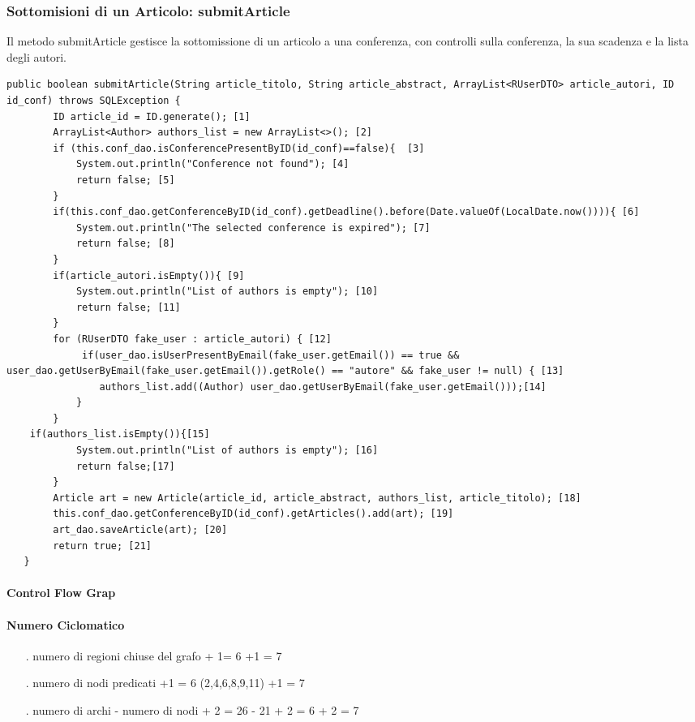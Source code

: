 \subsubsection{Sottomisioni di un Articolo: submitArticle}
Il metodo submitArticle gestisce la sottomissione di un articolo a una conferenza, con controlli sulla conferenza, la sua scadenza e la lista degli autori.
\begin{lstlisting}
public boolean submitArticle(String article_titolo, String article_abstract, ArrayList<RUserDTO> article_autori, ID id_conf) throws SQLException { 
        ID article_id = ID.generate(); [1]
        ArrayList<Author> authors_list = new ArrayList<>(); [2]
        if (this.conf_dao.isConferencePresentByID(id_conf)==false){  [3]
            System.out.println("Conference not found"); [4]
            return false; [5]
        }
        if(this.conf_dao.getConferenceByID(id_conf).getDeadline().before(Date.valueOf(LocalDate.now()))){ [6]
            System.out.println("The selected conference is expired"); [7]
            return false; [8]
        }
        if(article_autori.isEmpty()){ [9]
            System.out.println("List of authors is empty"); [10] 
            return false; [11]
        }
        for (RUserDTO fake_user : article_autori) { [12]
             if(user_dao.isUserPresentByEmail(fake_user.getEmail()) == true && user_dao.getUserByEmail(fake_user.getEmail()).getRole() == "autore" && fake_user != null) { [13]
                authors_list.add((Author) user_dao.getUserByEmail(fake_user.getEmail()));[14]
            }
        }
	if(authors_list.isEmpty()){[15]
            System.out.println("List of authors is empty"); [16]
            return false;[17]
        }
        Article art = new Article(article_id, article_abstract, authors_list, article_titolo); [18]
        this.conf_dao.getConferenceByID(id_conf).getArticles().add(art); [19]
        art_dao.saveArticle(art); [20]
        return true; [21]
   } 
\end{lstlisting} 
\paragraph{Control Flow Grap}
\paragraph{Numero Ciclomatico}
\begin{itemize}
\item[.] numero di regioni chiuse del grafo + 1= 6 +1 = 7
\item[.] numero di nodi predicati +1 = 6 (2,4,6,8,9,11) +1 = 7
\item[.] numero di archi - numero di nodi + 2 = 26 - 21 + 2 = 6 + 2 = 7  
\end{itemize}
